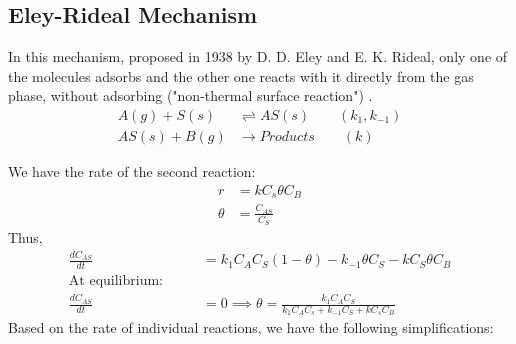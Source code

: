 \subsection{Eley-Rideal Mechanism}
In this mechanism, proposed in 1938 by D. D. Eley and E. K. Rideal, only one of
the molecules adsorbs and the other one reacts with it directly from the gas
phase, without adsorbing ("non-thermal surface reaction") \cite{eley_rideal}.
\begin{align*}
    A(g) + S(s) &\rightleftharpoons AS(s)  \qquad (k_1, k_{-1})\\
    AS(s) + B(g) &\longrightarrow Products \qquad (k)
\end{align*}

We have the rate of the second reaction:
\begin{align*}
    r &= k C_s \theta C_B\\
    \theta &= \frac{C_{AS}}{C_S}
\end{align*}
Thus,
\begin{align*}
    \frac{d C_{AS}}{dt} &= k_1 C_A C_S (1-\theta) - k_{-1} \theta C_S - k C_S \theta C_B\\
    \text{At equilibrium}:\qquad &\\
    \frac{d C_{AS}}{dt} &= 0
    \implies \theta = \frac{k_1 C_A C_S}{k_1 C_A C_s + k_{-1}C_S + k C_s C_B}
\end{align*}
Based on the rate of individual reactions, we have the following
simplifications:
